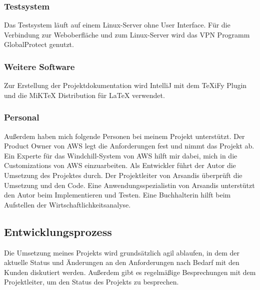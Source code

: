 \subsubsection{Testsystem}
Das Testsystem läuft auf einem Linux-Server ohne User Interface.
Für die Verbindung zur Weboberfläche und zum Linux-Server wird das VPN Programm GlobalProtect genutzt.

\subsubsection{Weitere Software}
Zur Erstellung der Projektdokumentation wird IntelliJ mit dem TeXiFy Plugin und die MiKTeX Distribution für LaTeX verwendet.

\subsubsection{Personal}
Außerdem haben mich folgende Personen bei meinem Projekt unterstützt.
Der Product Owner von \acs{AWS} legt die Anforderungen fest und nimmt das Projekt ab.
Ein Experte für das Windchill-System von \acs{AWS} hilft mir dabei, mich in die Customizations von \acs{AWS} einzuarbeiten.
Als Entwickler führt der Autor die Umsetzung des Projektes durch.
Der Projektleiter von Arsandis überprüft die Umsetzung und den Code.
Eine Anwendungsspezialistin von Arsandis unterstützt den Autor beim Implementieren und Testen.
Eine Buchhalterin hilft beim Aufstellen der Wirtschaftlichkeitsanalyse.

\subsection{Entwicklungsprozess}
\label{sec:Entwicklungsprozess}

Die Umsetzung meines Projekts wird grundsätzlich agil ablaufen, in dem der aktuelle Status und Änderungen an den Anforderungen nach Bedarf mit den Kunden diskutiert werden.
Außerdem gibt es regelmäßige Besprechungen mit dem Projektleiter, um den Status des Projekts zu besprechen.
